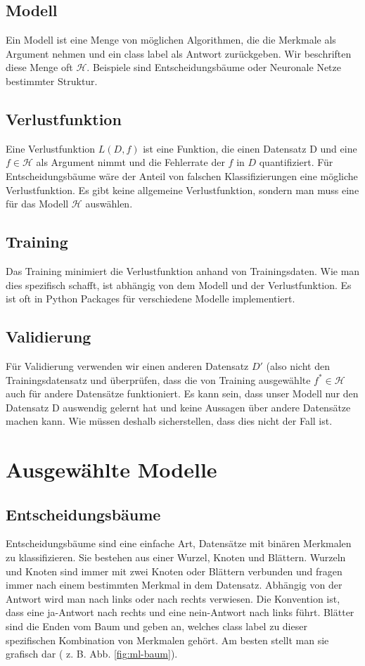 \subsection{Modell}
Ein Modell ist eine Menge von möglichen Algorithmen, die die Merkmale als Argument nehmen und ein class label als Antwort zurückgeben. Wir beschriften diese Menge oft $\mathcal{H}$. Beispiele sind Entscheidungsbäume oder Neuronale Netze bestimmter Struktur. 

\subsection{Verlustfunktion}
Eine Verlustfunktion $L(D,f)$ ist eine Funktion, die einen Datensatz D und eine $f \in \mathcal{H}$ als Argument nimmt und die Fehlerrate der $f$ in $D$ quantifiziert. Für Entscheidungsbäume wäre der Anteil von falschen Klassifizierungen eine mögliche Verlustfunktion. Es gibt keine allgemeine Verlustfunktion, sondern man muss eine für das Modell $\mathcal{H}$ auswählen.

\subsection{Training}
Das Training minimiert die Verlustfunktion anhand von Trainingsdaten. Wie man dies spezifisch schafft, ist abhängig von dem Modell und der Verlustfunktion. Es ist oft in Python Packages für verschiedene Modelle implementiert.

\subsection{Validierung}
Für Validierung verwenden wir einen anderen Datensatz $D'$ (also nicht den Trainingsdatensatz und überprüfen, dass die von Training ausgewählte $f^* \in \mathcal{H}$ auch für andere Datensätze funktioniert. Es kann sein, dass unser Modell nur den Datensatz D auswendig gelernt hat und keine Aussagen über andere Datensätze machen kann. Wie müssen deshalb sicherstellen, dass dies nicht der Fall ist.
\section{Ausgewählte Modelle}\label{ml:modelle}
\subsection{Entscheidungsbäume}
Entscheidungsbäume sind eine einfache Art, Datensätze mit binären Merkmalen zu klassifizieren. Sie bestehen aus einer Wurzel, Knoten und Blättern. 
Wurzeln und Knoten sind immer mit zwei Knoten oder Blättern verbunden und fragen immer nach einem bestimmten Merkmal in dem Datensatz. Abhängig von der Antwort wird man nach links oder nach rechts verwiesen. Die Konvention ist, dass eine ja-Antwort nach rechts und eine nein-Antwort nach links führt. Blätter sind die Enden vom Baum und geben  an, welches class label zu dieser spezifischen Kombination von Merkmalen gehört. Am besten stellt man sie grafisch dar ( z. B. Abb. \ref{fig:ml-baum}).\\

